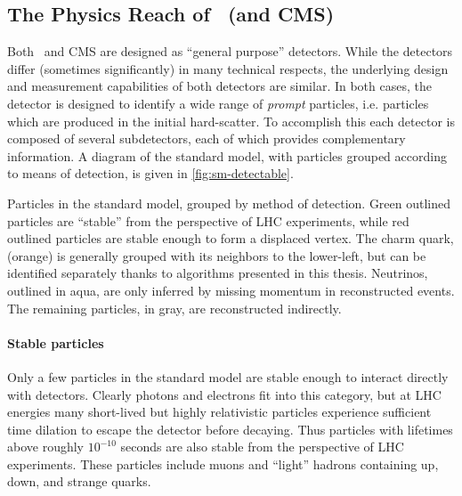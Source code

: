 
\subsection{The Physics Reach of \atlas\ (and CMS)}
Both \atlas\ and CMS are designed as ``general purpose'' detectors.
While the detectors differ (sometimes significantly) in many technical respects, the underlying design and measurement capabilities of both detectors are similar.
In both cases, the detector is designed to identify a wide range of \emph{prompt} particles, i.e. particles which are produced in the initial hard-scatter.
To accomplish this each detector is composed of several subdetectors, each of which provides complementary information.
A diagram of the standard model, with particles grouped according to means of detection, is given in \cref{fig:sm-detectable}.

\begin{cfig}
  \caption[Particles in the standard model grouped by detection method]{
    Particles in the standard model, grouped by method of detection.
    Green outlined particles are ``stable'' from the perspective of LHC experiments, while red outlined particles are stable enough to form a displaced vertex.
    The charm quark, (orange) is generally grouped with its neighbors to the lower-left, but can be identified separately thanks to algorithms presented in this thesis.
    Neutrinos, outlined in aqua, are only inferred by missing momentum in reconstructed events.
    The remaining particles, in gray, are reconstructed indirectly.
  }
  \label{fig:sm-detectable}
\end{cfig}

\paragraph{Stable particles} Only a few particles in the standard model are stable enough to interact directly with detectors.
Clearly photons and electrons fit into this category, but at LHC energies many short-lived but highly relativistic particles experience sufficient time dilation to escape the detector before decaying.
Thus particles with lifetimes above roughly $10^{-10}$ seconds are also stable from the perspective of LHC experiments.
These particles include muons and ``light'' hadrons containing up, down, and strange quarks.

